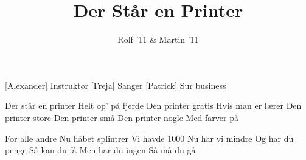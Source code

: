 \documentclass[a4paper,11pt]{article}
\title{Der Står en Printer}
\author{Rolf '11 \& Martin '11}
\begin{document}
\maketitle

\begin{roles}
[Alexander] Instruktør
[Freja] Sanger 
[Patrick] Sur business
\end{roles}

\begin{song}



 Der står en printer
Helt op' på fjerde
Den printer gratis
Hvis man er lærer
Den printer store
Den printer små
Den printer nogle
Med farver på

 For alle andre
Nu håbet splintrer
Vi havde 1000
Nu har vi mindre
Og har du penge
Så kan du få
Men har du ingen
Så må du gå





\end{song}
\end{document}
